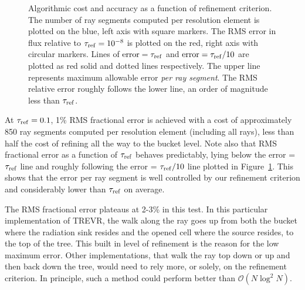 \documentclass[fleq,usenatbib]{mnras}
\newcommand{\acro}{TREVR}
\newcommand{\bigO}[1]{\mathcal{O}\left(#1\right)}
\newcommand{\tr}{\tau_{\rm ref}}
\begin{document}
{\begin{figure}
\caption{Algorithmic cost and accuracy as a function of refinement criterion. 
The number of ray segments computed per resolution element is plotted on the 
blue, left axis with square markers. The RMS error in flux relative to $\tr
=10^{-8}$ is plotted on the red, right axis with circular markers. Lines of 
${\rm error} = \tr$ and ${\rm error} = \tr/10$ are plotted as red solid and dotted 
lines respectively. The upper line represents maximum allowable error 
\textit{per ray segment}. The RMS relative error roughly follows the lower 
line, an order of magnitude less than $\tr$.}
\label{fig:refcrit}
\end{figure}

At $\tr=0.1$, 1\% RMS fractional error is achieved with a cost of 
approximately 850 ray segments computed per resolution element (including all rays), less than half 
the cost of refining all the way to the bucket level. Note also that RMS 
fractional error as a function of $\tr$ behaves predictably, lying below the 
error = $\tr$ line and roughly following the error = $\tr/10$ line plotted in 
Figure~\ref{fig:refcrit}. This shows that the error per ray segment is well
controlled by our refinement criterion and considerably lower than $\tr$ on average.

The RMS fractional error plateaus at 2-3\% in this test. In this particular 
implementation of \acro{}, the walk along the ray goes up from both the bucket 
where the radiation sink resides and the opened cell where the source resides, 
to the top of the tree. This built in level of refinement is the reason for 
the low maximum error. Other implementations, that walk the ray top down or up 
and then back down the tree, would need to rely more, or solely, on the 
refinement criterion. In principle, such a method could perform better than 
$\bigO{N\log^2 N}$.

}
\end{document}
